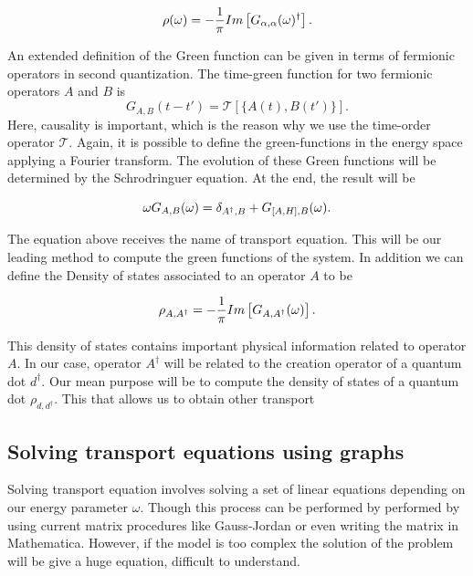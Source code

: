 \begin{equation}
    \rho(\omega)=-\frac{1}{\pi} Im \left[G_{\alpha,\alpha}(\omega)^{\dagger}\right].
\end{equation}

An extended definition of the Green function  can be given in terms of fermionic operators in second quantization.  The time-green function for two fermionic operators $A$ and $B$ is
\begin{equation}
  G_{A,B}(t-t') = \mathcal{T}[\{ A(t),B(t') \} ].
\end{equation}
Here, causality is important, which is the reason why we use the time-order operator $\mathcal{T}$. Again, it is possible to define the green-functions in the energy space applying a Fourier transform. The evolution of these Green functions will be determined by the Schrodringuer equation. At the end, the result will be

\begin{equation}
    \omega G_{A,B}(\omega)=\delta_{A^{\dagger},B}+G_{\left[A,H\right],B}(\omega).
\end{equation}

The equation above receives the name of transport equation. This will be our leading method to compute the green functions of the system. In addition we can define the Density of states associated to an operator $A$ to be 

\begin{equation}
    \rho_{A,A^\dagger}=-\frac{1}{\pi}Im\left[G_{A,A^\dagger}(\omega)\right].
    \label{eq:Density of States}
\end{equation}

This density of states contains important physical information related to operator $A$. In our case, operator $A^\dagger$ will be related to the creation operator of a quantum dot $d^\dagger$. Our mean purpose will be to compute the density of states of a quantum dot $\rho_{d,d^\dagger}$. This 
that allows us to obtain other transport 

\subsection{Solving transport equations using graphs \label{sec:GraphMethod}}


Solving transport equation involves solving a set of linear equations depending on our energy parameter $\omega$. Though this process can be performed by performed by using current matrix procedures like Gauss-Jordan or even writing the matrix in Mathematica. However, if the model is too complex the solution of the problem will be give a huge equation, difficult to understand. \\

